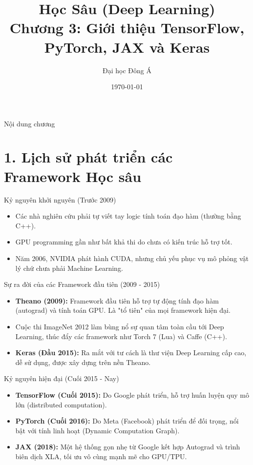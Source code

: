\documentclass[aspectratio=169]{beamer}
\title[Chương 3: Frameworks \& Keras]{Học Sâu (Deep Learning) \\ \vspace{0.5cm} \Large Chương 3: Giới thiệu TensorFlow, PyTorch, JAX và Keras}
\author{Đại học Đông Á}
\date{\today}
\begin{document}
\begin{frame}
    \titlepage
\end{frame}

\begin{frame}{Nội dung chương}
    \tableofcontents
\end{frame}

\section{1. Lịch sử phát triển các Framework Học sâu}

\begin{frame}{Kỷ nguyên khởi nguyên (Trước 2009)}
    \begin{itemize}
        \item Các nhà nghiên cứu phải tự viết tay logic tính toán đạo hàm (thường bằng C++).
        \item GPU programming gần như bất khả thi do chưa có kiến trúc hỗ trợ tốt.
        \item Năm 2006, NVIDIA phát hành CUDA, nhưng chủ yếu phục vụ mô phỏng vật lý chứ chưa phải Machine Learning.
    \end{itemize}
\end{frame}

\begin{frame}{Sự ra đời của các Framework đầu tiên (2009 - 2015)}
    \begin{itemize}
        \item \textbf{Theano (2009):} Framework đầu tiên hỗ trợ tự động tính đạo hàm (autograd) và tính toán GPU. Là "tổ tiên" của mọi framework hiện đại.
        \item Cuộc thi ImageNet 2012 làm bùng nổ sự quan tâm toàn cầu tới Deep Learning, thúc đẩy các framework như Torch 7 (Lua) và Caffe (C++).
        \item \textbf{Keras (Đầu 2015):} Ra mắt với tư cách là thư viện Deep Learning cấp cao, dễ sử dụng, được xây dựng trên nền Theano.
    \end{itemize}
\end{frame}

\begin{frame}{Kỷ nguyên hiện đại (Cuối 2015 - Nay)}
    \begin{itemize}
        \item \textbf{TensorFlow (Cuối 2015):} Do Google phát triển, hỗ trợ huấn luyện quy mô lớn (distributed computation).
        \item \textbf{PyTorch (Cuối 2016):} Do Meta (Facebook) phát triển để đối trọng, nổi bật với tính linh hoạt (Dynamic Computation Graph).
        \item \textbf{JAX (2018):} Một hệ thống gọn nhẹ từ Google kết hợp Autograd và trình biên dịch XLA, tối ưu vô cùng mạnh mẽ cho GPU/TPU.
    \end{itemize}
\end{frame}
\end{document}
